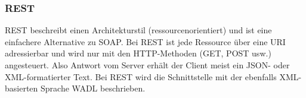 \subsubsection{REST}

REST beschreibt einen Architekturstil (ressourcenorientiert) und ist eine einfachere Alternative zu SOAP. Bei REST ist jede Ressource über eine \ac{URI} adressierbar und wird nur mit den HTTP-Methoden (GET, POST usw.) angesteuert. Also Antwort vom Server erhält der Client meist ein JSON- oder XML-formatierter Text. Bei REST wird die Schnittstelle mit der ebenfalls XML-basierten Sprache \ac{WADL} beschrieben.